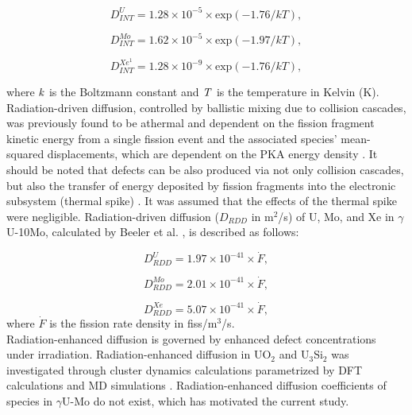 \documentclass[preprint,12pt]{elsarticle}
\begin{document}
\begin{equation}
D_{INT}^{U} = 1.28\times10^{-5}\times \textrm{exp}(-1.76/kT),
\end{equation}

\begin{equation}
D_{INT}^{Mo} = 1.62\times10^{-5}\times \textrm{exp}(-1.97/kT),
\end{equation}

\begin{equation}
D_{INT}^{Xe^{1}} = 1.28\times10^{-9}\times \textrm{exp}(-1.76/kT),
\end{equation}

\noindent where $\it{k}$ is the Boltzmann constant and $\it{T}$ is the temperature in Kelvin (K).\\
\indent Radiation-driven diffusion, controlled by ballistic mixing due to collision cascades, was previously found to be athermal and dependent on the fission fragment kinetic energy from a single fission event and the associated species' mean-squared displacements, which are dependent on the PKA energy density \cite{beeler2021radiation}. It should be noted that defects can be also produced via not only collision cascades, but also the transfer of energy deposited by fission fragments into the electronic subsystem (thermal spike) \cite{kolotova2017atomistic, kolotova2019atomistic}. It was assumed that the effects of the thermal spike were negligible. Radiation-driven diffusion ($D_{RDD}$ in m$^{2}$/s) of U, Mo, and Xe in $\gamma$U-10Mo, calculated by Beeler et al. \cite{beeler2021radiation}, is described as follows:

\begin{equation}
D_{RDD}^{U} = 1.97\times10^{-41}\times\dot{F},
\end{equation}

\begin{equation}
D_{RDD}^{Mo} = 2.01\times10^{-41}\times\dot{F},
\end{equation}

\begin{equation}
D_{RDD}^{Xe} = 5.07\times10^{-41}\times\dot{F},
\end{equation}
where $\dot{F}$ is the fission rate density in  fiss/m$^{3}$/s.\\
\indent Radiation-enhanced diffusion is governed by enhanced defect concentrations under irradiation. Radiation-enhanced diffusion in UO$_{2}$ and U$_{3}$Si$_{2}$ was investigated through cluster dynamics calculations parametrized by DFT calculations and MD simulations \cite{perriot2019atomistic, andersson2014atomistic, matthews2020cluster}. Radiation-enhanced diffusion coefficients of species in $\gamma$U-Mo do not exist, which has motivated the current study.
\end{document}
